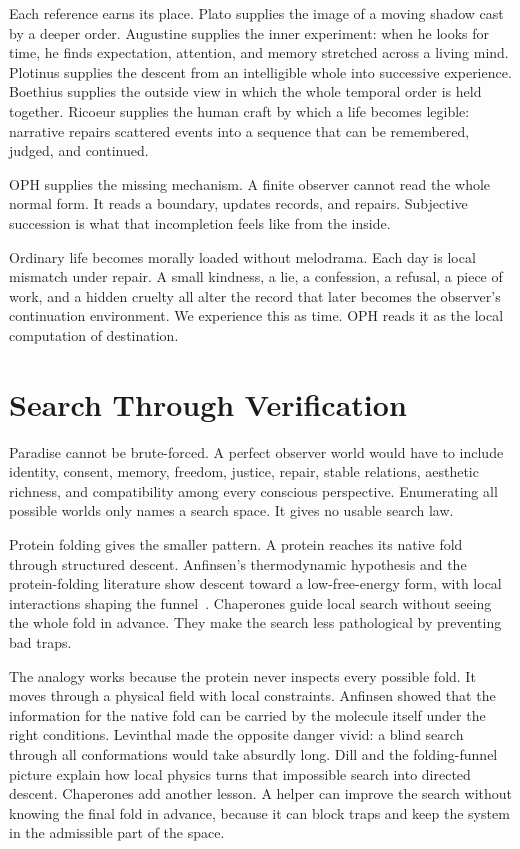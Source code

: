 \documentclass[11pt]{article}
\theoremstyle{remark}
\theoremstyle{plain}
\begin{document}
Each reference earns its place. Plato supplies the image of a moving
shadow cast by a deeper order. Augustine supplies the inner experiment: when he
looks for time, he finds expectation, attention, and memory stretched across a
living mind. Plotinus supplies the descent from an intelligible whole into
successive experience. Boethius supplies the outside view in which the whole
temporal order is held together. Ricoeur supplies the human craft by which a
life becomes legible: narrative repairs scattered events into a sequence that
can be remembered, judged, and continued.

OPH supplies the missing mechanism. A finite observer cannot read the whole
normal form. It reads a boundary, updates records, and repairs. Subjective succession is what
that incompletion feels like from the inside.

Ordinary life becomes morally loaded without melodrama. Each
day is local mismatch under repair. A small kindness, a lie, a confession, a
refusal, a piece of work, and a hidden cruelty all alter the record that later
becomes the observer's continuation environment. We experience this as time.
OPH reads it as the local computation of destination.

\section{Search Through Verification}

Paradise cannot be brute-forced. A perfect observer world would have to include
identity, consent, memory, freedom, justice, repair, stable relations, aesthetic
richness, and compatibility among every conscious perspective. Enumerating all
possible worlds only names a search space. It gives no usable search law.

Protein folding gives the smaller pattern. A protein reaches its native fold
through structured descent. Anfinsen's thermodynamic hypothesis and the
protein-folding literature show descent toward a low-free-energy form, with
local interactions shaping the funnel~\cite{Anfinsen1973,Levinthal1969,Dill1997}.
Chaperones guide local search without seeing the whole fold in advance. They
make the search less pathological by preventing bad traps.

The analogy works because the protein never inspects every possible fold.
It moves through a physical field with local constraints. Anfinsen showed that
the information for the native fold can be carried by the molecule itself under
the right conditions. Levinthal made the opposite danger vivid: a blind search
through all conformations would take absurdly long. Dill and the folding-funnel
picture explain how local physics turns that impossible search into directed
descent. Chaperones add another lesson. A helper can improve the search without
knowing the final fold in advance, because it can block traps and keep the
system in the admissible part of the space.
\end{document}
